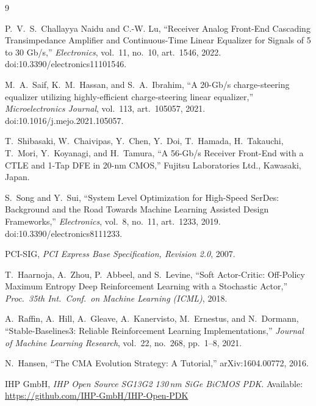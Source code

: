 \documentclass[10pt,a4paper]{article}
\begin{document}

\begin{thebibliography}{9}\small
\setlength{\itemsep}{2pt}

P.~V.~S.~Challayya Naidu and C.-W. Lu,
``Receiver Analog Front-End Cascading Transimpedance Amplifier and
Continuous-Time Linear Equalizer for Signals of 5 to 30 Gb/s,''
\emph{Electronics}, vol.~11, no.~10, art.~1546, 2022.
doi:10.3390/electronics11101546.

M.~A.~Saif, K.~M.~Hassan, and S.~A.~Ibrahim,
``A 20-Gb/s charge-steering equalizer utilizing highly-efficient charge-steering
linear equalizer,''
\emph{Microelectronics Journal}, vol.~113, art.~105057, 2021.
doi:10.1016/j.mejo.2021.105057.

T.~Shibasaki, W.~Chaivipas, Y.~Chen, Y.~Doi, T.~Hamada, H.~Takauchi, T.~Mori,
Y.~Koyanagi, and H.~Tamura,
``A 56-Gb/s Receiver Front-End with a CTLE and 1-Tap DFE in 20-nm CMOS,''
Fujitsu Laboratories Ltd., Kawasaki, Japan.

S.~Song and Y.~Sui,
``System Level Optimization for High-Speed SerDes: Background and the Road
Towards Machine Learning Assisted Design Frameworks,''
\emph{Electronics}, vol.~8, no.~11, art.~1233, 2019.
doi:10.3390/electronics8111233.

PCI-SIG, \emph{PCI Express Base Specification, Revision 2.0}, 2007.

T.~Haarnoja, A.~Zhou, P.~Abbeel, and S.~Levine,
``Soft Actor-Critic: Off-Policy Maximum Entropy Deep Reinforcement Learning with
a Stochastic Actor,''
\emph{Proc.\ 35th Int.\ Conf.\ on Machine Learning (ICML)}, 2018.

A.~Raffin, A.~Hill, A.~Gleave, A.~Kanervisto, M.~Ernestus, and N.~Dormann,
``Stable-Baselines3: Reliable Reinforcement Learning Implementations,''
\emph{Journal of Machine Learning Research}, vol.~22, no.~268, pp.~1--8, 2021.

N.~Hansen, ``The CMA Evolution Strategy: A Tutorial,''
arXiv:1604.00772, 2016.

IHP GmbH, \emph{IHP Open Source SG13G2 130\,nm SiGe BiCMOS PDK}.
Available: \url{https://github.com/IHP-GmbH/IHP-Open-PDK}

\end{thebibliography}
\end{document}
